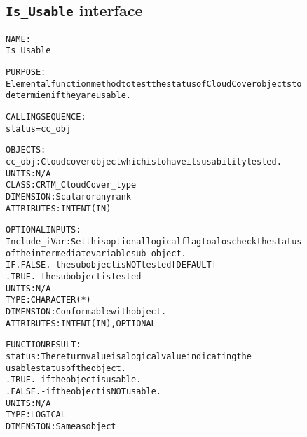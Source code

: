 \subsection{\texttt{Is\_Usable} interface}
  \label{sec:Is_Usable_interface}
  \begin{alltt}
 
  NAME:
    Is_Usable
 
  PURPOSE:
    Elemental function method to test the status of CloudCover objects to
    determien if they are usable.
 
  CALLING SEQUENCE:
    status = cc_obj%Is_Usable( Include_iVar = Include_iVar )
 
  OBJECTS:
    cc_obj:        Cloud cover object which is to have its usability tested.
                   UNITS:      N/A
                   CLASS:      CRTM_CloudCover_type
                   DIMENSION:  Scalar or any rank
                   ATTRIBUTES: INTENT(IN)
 
  OPTIONAL INPUTS:
    Include_iVar:  Set this optional logical flag to alos check the status
                   of the intermediate variable sub-object.
                   IF .FALSE. - the subobject is NOT tested [DEFAULT]
                      .TRUE.  - the subobject is tested
                   UNITS:      N/A
                   TYPE:       CHARACTER(*)
                   DIMENSION:  Conformable with object.
                   ATTRIBUTES: INTENT(IN), OPTIONAL
 
  FUNCTION RESULT:
    status:        The return value is a logical value indicating the
                   usable status of the object.
                     .TRUE.  - if the object is usable.
                     .FALSE. - if the object is NOT usable.
                   UNITS:      N/A
                   TYPE:       LOGICAL
                   DIMENSION:  Same as object
 
  \end{alltt}
